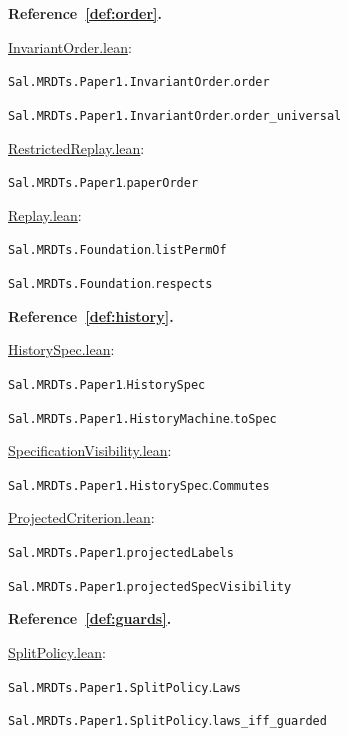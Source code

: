 \medskip\noindent\textbf{Reference~\ref{def:order}.}\par\nobreak
\noindent\href{https://github.com/fplaunchpad/sal/blob/07fe525/Sal/MRDTs/Paper1/InvariantOrder.lean}{InvariantOrder.lean}:\par
{\small\nolinkurl{Sal.MRDTs.Paper1.InvariantOrder}.\allowbreak\nolinkurl{order}}\par
{\small\nolinkurl{Sal.MRDTs.Paper1.InvariantOrder}.\allowbreak\nolinkurl{order_universal}}\par
\noindent\href{https://github.com/fplaunchpad/sal/blob/paper1/Sal/MRDTs/Paper1/RestrictedReplay.lean}{RestrictedReplay.lean}:\par
{\small\nolinkurl{Sal.MRDTs.Paper1}.\allowbreak\nolinkurl{paperOrder}}\par
\noindent\href{https://github.com/fplaunchpad/sal/blob/07fe525/Sal/MRDTs/Framework/Base/Replay.lean}{Replay.lean}:\par
{\small\nolinkurl{Sal.MRDTs.Foundation}.\allowbreak\nolinkurl{listPermOf}}\par
{\small\nolinkurl{Sal.MRDTs.Foundation}.\allowbreak\nolinkurl{respects}}\par

\medskip\noindent\textbf{Reference~\ref{def:history}.}\par\nobreak
\noindent\href{https://github.com/fplaunchpad/sal/blob/07fe525/Sal/MRDTs/Paper1/HistorySpec.lean}{HistorySpec.lean}:\par
{\small\nolinkurl{Sal.MRDTs.Paper1}.\allowbreak\nolinkurl{HistorySpec}}\par
{\small\nolinkurl{Sal.MRDTs.Paper1.HistoryMachine}.\allowbreak\nolinkurl{toSpec}}\par
\noindent\href{https://github.com/fplaunchpad/sal/blob/paper1/Sal/MRDTs/Paper1/SpecificationVisibility.lean}{SpecificationVisibility.lean}:\par
{\small\nolinkurl{Sal.MRDTs.Paper1.HistorySpec}.\allowbreak\nolinkurl{Commutes}}\par
\noindent\href{https://github.com/fplaunchpad/sal/blob/07fe525/Sal/MRDTs/Paper1/ProjectedCriterion.lean}{ProjectedCriterion.lean}:\par
{\small\nolinkurl{Sal.MRDTs.Paper1}.\allowbreak\nolinkurl{projectedLabels}}\par
{\small\nolinkurl{Sal.MRDTs.Paper1}.\allowbreak\nolinkurl{projectedSpecVisibility}}\par

\medskip\noindent\textbf{Reference~\ref{def:guards}.}\par\nobreak
\noindent\href{https://github.com/fplaunchpad/sal/blob/paper1/Sal/MRDTs/Paper1/SplitPolicy.lean}{SplitPolicy.lean}:\par
{\small\nolinkurl{Sal.MRDTs.Paper1.SplitPolicy}.\allowbreak\nolinkurl{Laws}}\par
{\small\nolinkurl{Sal.MRDTs.Paper1.SplitPolicy}.\allowbreak\nolinkurl{laws_iff_guarded}}\par

